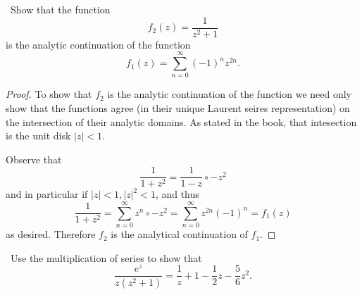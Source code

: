 \documentclass[11pt]{amsart}
\theoremstyle{definition}
\numberwithin{theorem}{section}
\numberwithin{definition}{section}
\numberwithin{equation}{section}
\begin{document}
\medskip {}\ Show that the function
\begin{equation*}
	f_2(z) = \frac{1}{z^2 + 1}
\end{equation*}
is the analytic continuation of the function
\begin{equation*}
	f_1(z) = \sum_{n=0}^\infty (-1)^n z^{2n}.
\end{equation*}
\begin{proof}
	To show that $f_2$ is the analytic continuation of the function we need only show that the functions agree (in their unique Laurent seires representation)
 	on the intersection of their analytic domains. As stated in the book, that intesection is the unit disk $|z| < 1$.

 	Observe that
 	\begin{equation*}
 		\frac{1}{1 + z^2} = \frac{1}{1 - z} \circ -z^2	
 	\end{equation*}
 	and in particular if $|z| < 1, |z|^2 < 1$, and thus
 	\begin{equation*}
 		\frac{1}{1 + z^2} = \sum_{n=0}^\infty z^n \circ -z^2 = \sum_{n=0}^\infty z^{2n}(-1)^n = f_1(z)
 	\end{equation*}
 	as desired. Therefore $f_2$ is the analytical continuation of $f_1.$
\end{proof}
\medskip {}\ Use the multiplication of series to show that
\begin{equation*}
	\frac{e^z}{z(z^2+1)} = \frac{1}{z} + 1 - \frac{1}{2}z - \frac{5}{6}z^2.
\end{equation*}
\end{document}
